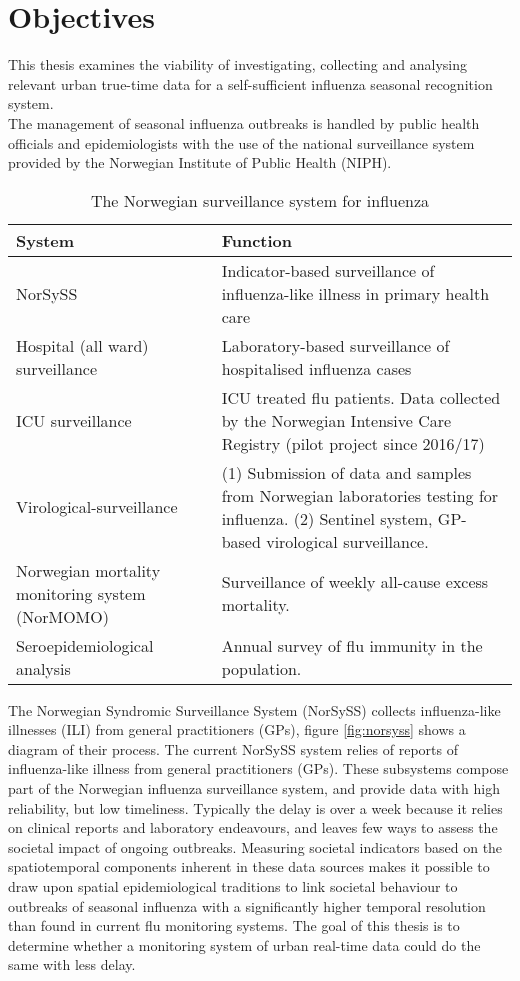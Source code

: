 \section{Objectives}
This thesis examines the viability of investigating, collecting and analysing relevant urban true-time data for a self-sufficient influenza seasonal recognition system.
\\
The management of seasonal influenza outbreaks is handled by public health officials and epidemiologists with the use of the national surveillance system provided by the Norwegian Institute of Public Health (NIPH)\cite{niph}.
  
\begin{center}
\begin{table}
\begin{tabular}{ | m{9em} | m{10cm}| }
 \hline
 \textbf{System} & \textbf{Function} \\ [0.5ex] 
 \hline
 NorSySS & Indicator-based surveillance of influenza-like illness in primary health care \\ 
  \hline
 Hospital (all ward) surveillance  & Laboratory-based surveillance of hospitalised influenza cases \\[5ex]
  \hline
 ICU surveillance & ICU treated flu patients. Data collected by the Norwegian Intensive Care Registry (pilot project since 2016/17) \\
  \hline
 Virological-surveillance & (1) Submission of data and samples from Norwegian laboratories testing for influenza.
(2) Sentinel system, GP-based virological surveillance. \\[5ex]
  \hline
 Norwegian mortality monitoring system (NorMOMO) & Surveillance of weekly all-cause excess mortality. \\[5ex]
 \hline
 Seroepidemiological analysis & Annual survey of flu immunity in the population. \\ [5ex] 
 \hline
\end{tabular}
\caption{The Norwegian surveillance system for influenza}
 \label{table:1}
\end{table}
\end{center}

The Norwegian Syndromic Surveillance System (NorSySS) collects influenza-like illnesses (ILI) from general practitioners (GPs)\cite{NorSySS}, figure \ref{fig:norsyss} shows a diagram of their process. The current NorSySS system relies of reports of influenza-like illness from general practitioners (GPs).  These	 subsystems compose part of the Norwegian influenza surveillance system, and provide data with high reliability, but low timeliness. Typically the delay is over a week because it relies on clinical reports and laboratory endeavours, and leaves few ways to assess the societal impact of ongoing outbreaks. Measuring societal indicators based on the spatiotemporal components inherent in these data sources makes it possible to draw upon spatial epidemiological traditions to link societal behaviour to outbreaks of seasonal influenza with a significantly higher temporal resolution than found in current flu monitoring systems. The goal of this thesis is to determine whether a monitoring system of urban real-time data could do the same with less delay.


